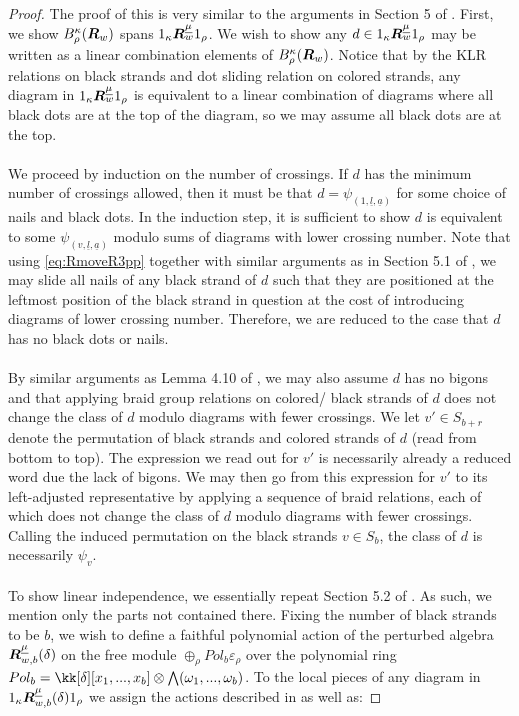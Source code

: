\documentclass{article}
\begin{document}
\begin{proof}
    The proof of this is very similar to the arguments in Section 5 of \cite{Na}. 
    First, we show $B^\kappa_\rho({\boldsymbol{R}}_w)$ spans $1_\kappa {\boldsymbol{R}}_w^{\underline{\mu}} 1_\rho$. We wish to show any $d \in 1_\kappa {\boldsymbol{R}}_w^{\underline{\mu}} 1_\rho$ may be written as a linear combination elements of $B^\kappa_\rho({\boldsymbol{R}}_w)$. Notice that by the KLR relations on black strands and dot sliding relation on colored strands, any diagram in $1_\kappa {\boldsymbol{R}}_w^{\underline{\mu}} 1_\rho$ is equivalent to a linear combination of diagrams where all black dots are at the top of the diagram, so we may assume all black dots are at the top. \\ \\
    We proceed by induction on the number of crossings. If $d$ has the minimum number of crossings allowed, then it must be that $d = \psi_{(1, \underline{l}, \underline{a})}$ for some choice of nails and black dots. In the induction step, it is sufficient to show $d$ is equivalent to some $\psi_{(v, \underline{l}, \underline{a})}$ modulo sums of diagrams with lower crossing number. Note that using \ref{eq:RmoveR3pp} together with similar arguments as in Section 5.1 of \cite{Na}, we may slide all nails of any black strand of $d$ such that they are positioned at the leftmost position of the black strand in question at the cost of introducing diagrams of lower crossing number. Therefore, we are reduced to the case that $d$ has no black dots or nails.\\ \\
    By similar arguments as Lemma 4.10 of \cite{Web}, we may also assume $d$ has no bigons and that applying braid group relations on colored/ black strands of $d$ does not change the class of $d$ modulo diagrams with fewer crossings. We let $v'\in S_{b+r}$ denote the permutation of black strands and colored strands of $d$ (read from bottom to top). The expression we read out for $v'$ is necessarily already a reduced word due the lack of bigons. We may then go from this expression for $v'$ to its left-adjusted representative by applying a sequence of braid relations, each of which does not change the class of $d$ modulo diagrams with fewer crossings. Calling the induced permutation on the black strands $v \in S_b$, the class of $d$ is necessarily $\psi_v$.
    \\  \\
    To show linear independence, we essentially repeat Section 5.2 of \cite{Na}. As such, we mention only the parts not contained there. Fixing the number of black strands to be $b$, we wish to define a faithful polynomial action of the perturbed algebra ${\boldsymbol{R}}^{\underline{\mu}}_{w,b} (\delta)$ on the free module $\oplus_\rho Pol_b \varepsilon_\rho$ over the polynomial ring $Pol_b = \kk [\delta] [x_1,...,x_b]\otimes \bigwedge (\omega_1,...,\omega_b)$. To the local pieces of any diagram in $1_\kappa {\boldsymbol{R}}^{\underline{\mu}}_{w,b} (\delta)1_\rho$ we assign the actions described in \cite{Na} as well as:

\end{proof}
\end{document}
